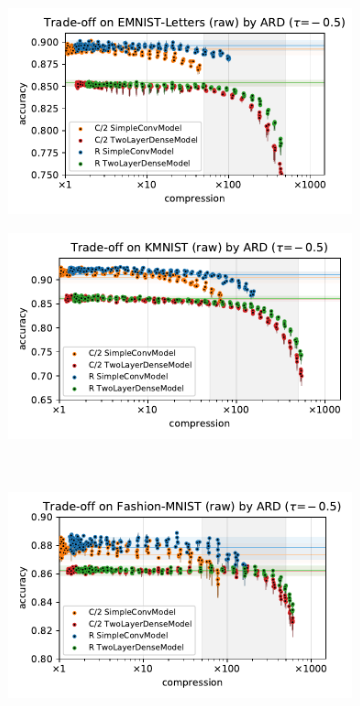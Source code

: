\documentclass[a4paper,10pt,twocolumn]{article}
\begin{document}
\begin{figure}[b]
  \centering
  \begin{subfigure}[b]{0.5\columnwidth}
    \centering
    \includegraphics[width=\linewidth]{figure__mnist-like__trade-off/appendix__cmp__ARD__emnist_letters__raw__-0.5.pdf}
  \end{subfigure}%
  \begin{subfigure}[b]{0.5\columnwidth}
    \centering
    \includegraphics[width=\linewidth]{figure__mnist-like__trade-off/appendix__cmp__ARD__kmnist__raw__-0.5.pdf}
  \end{subfigure} \\%
  \begin{subfigure}[b]{0.5\columnwidth}
    \centering
    \includegraphics[width=\linewidth]{figure__mnist-like__trade-off/appendix__cmp__ARD__fashionmnist__raw__-0.5.pdf}

\end{subfigure}
\end{figure}
\end{document}
